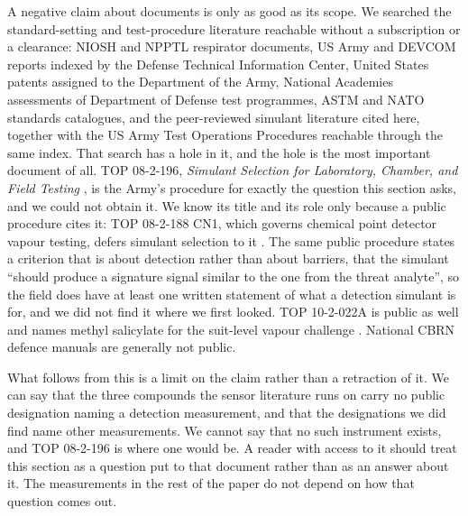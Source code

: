 \documentclass[1p,times]{elsarticle}
\begin{document}
A negative claim about documents is only as good as its scope. We searched the
standard-setting and test-procedure
literature reachable without a subscription or a clearance: NIOSH and NPPTL
respirator documents, US Army and DEVCOM reports indexed by the Defense
Technical Information Center, United States patents assigned to the Department
of the Army, National Academies assessments of Department of Defense test
programmes, ASTM and NATO standards catalogues, and the peer-reviewed simulant
literature cited here, together with the US Army Test Operations Procedures
reachable through the same index. That search has a hole in it, and the hole is
the most important document of all. TOP 08-2-196, \emph{Simulant Selection for
Laboratory, Chamber, and Field Testing} \cite{top082196}, is the Army's
procedure for exactly the question this section asks, and we could not obtain
it. We know its title and its role only because a public procedure cites it:
TOP 08-2-188 CN1, which governs chemical point detector vapour testing, defers
simulant selection to it \cite{top082188}. The same public procedure states a
criterion that is about detection rather than about barriers, that the simulant
``should produce a signature signal similar to the one from the threat
analyte'', so the field does have at least one written statement of what a
detection simulant is for, and we did not find it where we first looked. TOP
10-2-022A is public as well and names methyl salicylate for the suit-level
vapour challenge \cite{top102022a}. National CBRN defence manuals are generally
not public.

What follows from this is a limit on the claim rather than a retraction of it.
We can say that the three compounds the sensor literature runs on carry no
public designation naming a detection measurement, and that the designations we
did find name other measurements. We cannot say that no such instrument exists,
and TOP 08-2-196 is where one would be. A reader with access to it should treat
this section as a question put to that document rather than as an answer about
it. The measurements in the rest of the paper do not depend on how that question
comes out.
\end{document}
